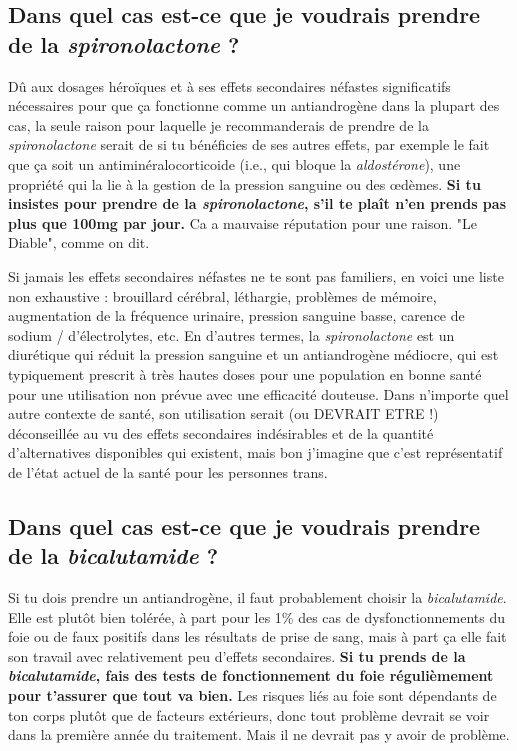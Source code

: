 \documentclass{article}
\begin{document}
\subsection{Dans quel cas est-ce que je voudrais prendre de la \textit{spironolactone} ?}

Dû aux dosages héroïques et à ses effets secondaires néfastes significatifs nécessaires pour que ça fonctionne comme un antiandrogène dans la plupart des cas, la seule raison pour laquelle je recommanderais de prendre de la \textit{spironolactone} serait de si tu bénéficies de ses autres effets, par exemple le fait que ça soit un antiminéralocorticoide (i.e., qui bloque la \textit{aldostérone}), une propriété qui la lie à la gestion de la pression sanguine ou des œdèmes. \textbf{Si tu insistes pour prendre de la \textit{spironolactone}, s'il te plaît n'en prends pas plus que 100mg par jour.} Ca a mauvaise réputation pour une raison. "Le Diable", comme on dit. 

Si jamais les effets secondaires néfastes ne te sont pas familiers, en voici une liste non exhaustive : brouillard cérébral, léthargie, problèmes de mémoire, augmentation de la fréquence urinaire, pression sanguine basse, carence de sodium / d'électrolytes, etc. En d'autres termes, la \textit{spironolactone} est un diurétique qui réduit la pression sanguine et un antiandrogène médiocre, qui est typiquement prescrit à très hautes doses pour une population en bonne santé pour une utilisation non prévue avec une efficacité douteuse. Dans n'importe quel autre contexte de santé, son utilisation serait (ou DEVRAIT ETRE !) déconseillée au vu des effets secondaires indésirables et de la quantité d'alternatives disponibles qui existent, mais bon j'imagine que c'est représentatif de l'état actuel de la santé pour les personnes trans.  

\subsection{Dans quel cas est-ce que je voudrais prendre de la \textit{bicalutamide} ?}

Si tu dois prendre un antiandrogène, il faut probablement choisir la \textit{bicalutamide}. Elle est plutôt bien tolérée, à part pour les 1\% des cas de dysfonctionnements du foie ou de faux positifs dans les résultats de prise de sang, mais à part ça elle fait son travail avec relativement peu d'effets secondaires. \textbf{Si tu prends de la \textit{bicalutamide}, fais des tests de fonctionnement du foie régulièmement pour t'assurer que tout va bien.} Les risques liés au foie sont dépendants de ton corps plutôt que de facteurs extérieurs, donc tout problème devrait se voir dans la première année du traitement. Mais il ne devrait pas y avoir de problème.
\end{document}
